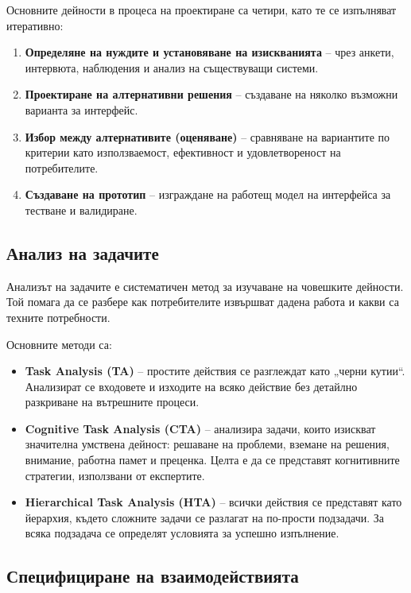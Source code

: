 \documentclass{scrartcl}
\begin{document}
\begin{FlushLeft}
Основните дейности в процеса на проектиране са четири, като те се изпълняват итеративно:
\begin{enumerate}
    \item \textbf{Определяне на нуждите и установяване на изискванията} – чрез анкети, интервюта, наблюдения и анализ на съществуващи системи.
    \item \textbf{Проектиране на алтернативни решения} – създаване на няколко възможни варианта за интерфейс.
    \item \textbf{Избор между алтернативите (оценяване)} – сравняване на вариантите по критерии като използваемост, ефективност и удовлетвореност на потребителите.
    \item \textbf{Създаване на прототип} – изграждане на работещ модел на интерфейса за тестване и валидиране.
\end{enumerate}

\subsection{Анализ на задачите}

Анализът на задачите е систематичен метод за изучаване на човешките дейности. Той помага да се разбере как потребителите извършват дадена работа и какви са техните потребности.

Основните методи са:
\begin{itemize}
    \item \textbf{Task Analysis (TA)} – простите действия се разглеждат като „черни кутии“. Анализират се входовете и изходите на всяко действие без детайлно разкриване на вътрешните процеси.
    \item \textbf{Cognitive Task Analysis (CTA)} – анализира задачи, които изискват значителна умствена дейност: решаване на проблеми, вземане на решения, внимание, работна памет и преценка. Целта е да се представят когнитивните стратегии, използвани от експертите.
    \item \textbf{Hierarchical Task Analysis (HTA)} – всички действия се представят като йерархия, където сложните задачи се разлагат на по-прости подзадачи. За всяка подзадача се определят условията за успешно изпълнение.
\end{itemize}

\subsection{Специфициране на взаимодействията}


\end{FlushLeft}
\end{document}
